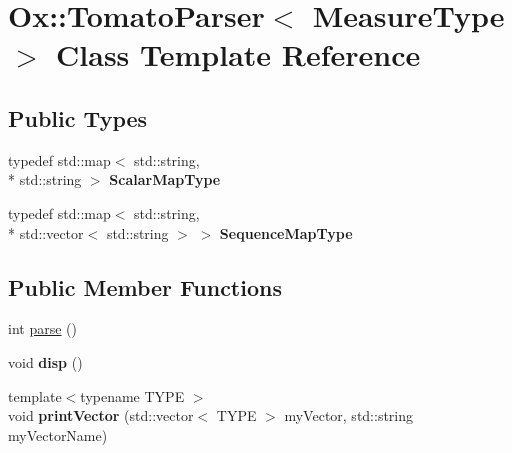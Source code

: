 \hypertarget{class_ox_1_1_tomato_parser}{\section{Ox\-:\-:Tomato\-Parser$<$ Measure\-Type $>$ Class Template Reference}
\label{class_ox_1_1_tomato_parser}
}
\subsection*{Public Types}
\begin{DoxyCompactItemize}
\item 
\hypertarget{class_ox_1_1_tomato_parser_a970772493cb033f36b3964b2cccffe83}{typedef std\-::map$<$ std\-::string, \\*
std\-::string $>$ {\bfseries Scalar\-Map\-Type}}\label{class_ox_1_1_tomato_parser_a970772493cb033f36b3964b2cccffe83}

\item 
\hypertarget{class_ox_1_1_tomato_parser_a5aab879ae09bffca217f7d4e5ef0ff5b}{typedef std\-::map$<$ std\-::string, \\*
std\-::vector$<$ std\-::string $>$ $>$ {\bfseries Sequence\-Map\-Type}}\label{class_ox_1_1_tomato_parser_a5aab879ae09bffca217f7d4e5ef0ff5b}

\end{DoxyCompactItemize}
\subsection*{Public Member Functions}
\begin{DoxyCompactItemize}
\item 
int \hyperlink{class_ox_1_1_tomato_parser_a5dfc95e484d1e1212a8c508f0b89cb88}{parse} ()
\item 
\hypertarget{class_ox_1_1_tomato_parser_abb80cd39d5e9ca0ad0353199283309c1}{void {\bfseries disp} ()}\label{class_ox_1_1_tomato_parser_abb80cd39d5e9ca0ad0353199283309c1}

\item 
\hypertarget{class_ox_1_1_tomato_parser_a686f2cdc4075a93eeb35bb0266e53636}{{\footnotesize template$<$typename T\-Y\-P\-E $>$ }\\void {\bfseries print\-Vector} (std\-::vector$<$ T\-Y\-P\-E $>$ my\-Vector, std\-::string my\-Vector\-Name)}\label{class_ox_1_1_tomato_parser_a686f2cdc4075a93eeb35bb0266e53636}

\end{DoxyCompactItemize}
